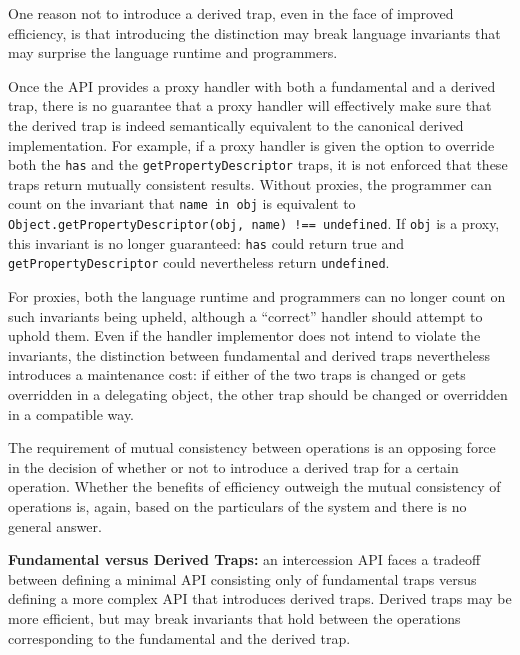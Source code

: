 \documentclass{sig-alternate}
\begin{document}
One reason not to introduce a derived trap, even in the face of improved efficiency, is that introducing the distinction may break language invariants that may surprise the language runtime and programmers.

Once the API provides a proxy handler with both a fundamental and a derived trap, there is no guarantee that a proxy handler will effectively make sure that the derived trap is indeed semantically equivalent to the canonical derived implementation. For example, if a proxy handler is given the option to override both the \texttt{has} and the \texttt{getPropertyDescriptor} traps, it is not enforced that these traps return mutually consistent results. Without proxies, the programmer can count on the invariant that \texttt{name in obj} is equivalent to \texttt{Object.getPropertyDescriptor(obj, name) !== undefined}. If \texttt{obj} is a proxy, this invariant is no longer guaranteed: \texttt{has} could return true and \texttt{getPropertyDescriptor} could nevertheless return \texttt{undefined}.

For proxies, both the language runtime and programmers can no longer count on such invariants being upheld, although a ``correct'' handler should attempt to uphold them. Even if the handler implementor does not intend to violate the invariants, the distinction between fundamental and derived traps nevertheless introduces a maintenance cost: if either of the two traps is changed or gets overridden in a delegating object, the other trap should be changed or overridden in a compatible way.

The requirement of mutual consistency between operations is an opposing force in the decision of whether or not to introduce a derived trap for a certain operation. Whether the benefits of efficiency outweigh the mutual consistency of operations is, again, based on the particulars of the system and there is no general answer.

\textbf{Fundamental versus Derived Traps:} an intercession API faces a tradeoff between defining a minimal API consisting only of fundamental traps versus defining a more complex API that introduces derived traps. Derived traps may be more efficient, but may break invariants that hold between the operations corresponding to the fundamental and the derived trap.

\end{document}
